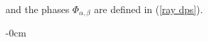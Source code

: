 \documentclass[quantumrep,article,submit,pdftex,moreauthors]{Definitions/mdpi}
\begin{document}
and the phases $\Phi_{\alpha,\beta}$ are defined in (\ref{ray dps}).

\begin{adjustwidth}{-\extralength}{0cm}



%


\end{adjustwidth}
\end{document}
